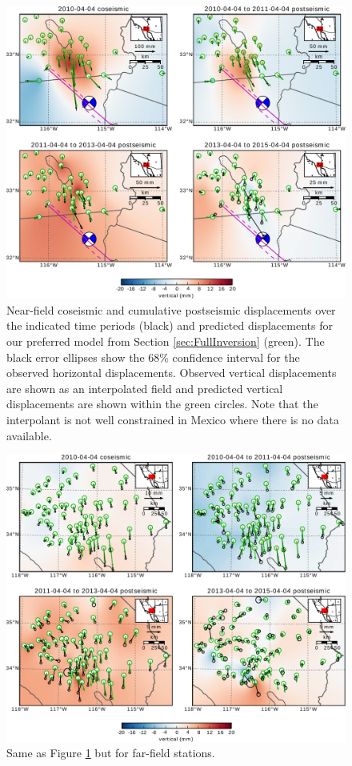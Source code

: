 \documentclass[draft,linenumbers]{AGUJournal}
\begin{document}
\begin{figure}
\includegraphics[scale=0.9]{Figures/2016jb013114-p04}
\centering 
\caption{Near-field coseismic and cumulative postseismic displacements over the indicated time periods (black) and predicted displacements for our preferred model from Section \ref{sec:FullInversion} (green).  The black error ellipses show the 68\% confidence interval for the observed horizontal displacements.  Observed vertical displacements are shown as an interpolated field and predicted vertical displacements are shown within the green circles.  Note that the interpolant is not well constrained in Mexico where there is no data available.}
\label{fig:NearField}
\end{figure}

\begin{figure}
\includegraphics[scale=0.9]{Figures/2016jb013114-p05}
\centering 
\caption{Same as Figure \ref{fig:NearField} but for far-field stations.}
\label{fig:FarField}
\end{figure}
\end{document}
